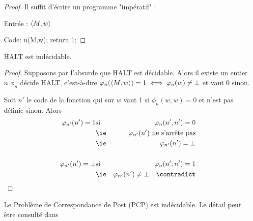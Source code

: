 \begin{proof}
	Il suffit d'écrire un programme "impératif" :

	Entrée : $\left\langle M,w\right\rangle$

	Code:
	u(M,w);
	return 1;

\end{proof}

\begin{prop}
	HALT est indécidable.
\end{prop}

\begin{proof}
	Supposons par l'absurde que HALT est décidable. Alors il existe un entier $n$ \tq $\phi_n$ décide HALT, c'est-à-dire
	$ \varphi_n(\left\langle M, w\right\rangle ) = 1 \iff \varphi_n(w) \neq \bot $ et vaut $0$ sinon.

	Soit $n'$ le code de la fonction qui sur $w$ vaut 1 si $\phi_n (w,w) = 0 $ et n'est pas définie sinon. Alors
	\begin{eqnarray*}
		\phi_{n'}(n') = 1 & \text{si} & \phi_n(n',n') = 0\\
		&\text{\ie}& \phi_{n'}(n') \text{ ne s'arrête pas} \\
		&\text{\ie}& \phi_{n'}(n') = \bot\\\\
		\phi_{n'}(n') = \bot & \text{si} & \phi_n(n',n') = 1\\
		&\text{\ie}& \phi_{n'}(n') \neq \bot \quad \contradict
	\end{eqnarray*}
\end{proof}

\begin{exemple}
	Le Problème de Correspondance de Post (PCP) est indécidable. Le détail peut être consulté dans \cite[Chapter~5.2]{sipser}
\end{exemple}
